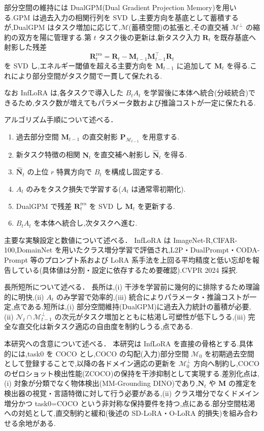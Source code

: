 部分空間の維持には DualGPM(Dual Gradient Projection Memory)を用いる.GPM \cite{gpm} は過去入力の相関行列を SVD し,主要方向を基底として蓄積するが,DualGPM はタスク増加に応じて,$\mathcal{M}$(蓄積空間)の拡張と,その直交補 $\mathcal{M}^{\perp}$ の縮約の双方を陽に管理する.第 $t$ タスク後の更新は,新タスク入力 $\mathbf{R}_t$ を既存基底へ射影した残差
\begin{equation}
\mathbf{R}_t^{\text{res}} = \mathbf{R}_t - \mathbf{M}_{t-1}\mathbf{M}_{t-1}^\top \mathbf{R}_t
\end{equation}
を SVD し,エネルギー閾値を超える主要方向を $\mathbf{M}_{t-1}$ に追加して $\mathbf{M}_t$ を得る.これにより部分空間がタスク間で一貫して保たれる.

なお InfLoRA は,各タスクで導入した $B_t A_t$ を学習後に本体へ統合(分岐統合)できるため,タスク数が増えてもパラメータ数および推論コストが一定に保たれる.

アルゴリズム手順について述べる．
\begin{enumerate}
\item 過去部分空間 $\mathbf{M}_{t-1}$ の直交射影 $\mathbf{P}_{\mathcal{M}_{t-1}}$ を用意する.
\item 新タスク特徴の相関 $\mathbf{N}_t$ を直交補へ射影し $\widehat{\mathbf{N}}_t$ を得る.
\item $\widehat{\mathbf{N}}_t$ の上位 $r$ 特異方向で $B_t$ を構成し固定する.
\item $A_t$ のみをタスク損失で学習する($A_t$ は通常零初期化).
\item DualGPM で残差 $\mathbf{R}_t^{\text{res}}$ を SVD し $\mathbf{M}_t$ を更新する.
\item $B_t A_t$ を本体へ統合し,次タスクへ進む.
\end{enumerate}

主要な実験設定と数値について述べる．
InfLoRA \cite{inflora} は ImageNet-R,CIFAR-100,DomainNet を用いたクラス増分学習で評価され,L2P・DualPrompt・CODA-Prompt 等のプロンプト系および LoRA 系手法を上回る平均精度と低い忘却を報告している(具体値は分割・設定に依存するため要確認).CVPR 2024 採択.

長所短所について述べる．
長所は,(i) 干渉を学習前に幾何的に排除するため理論的に明快,(ii) $A_t$ のみ学習で効率的,(iii) 統合によりパラメータ・推論コストが一定,点である.短所は,(i) 部分空間維持(DualGPM)に過去入力統計の蓄積が必要,(ii) $\mathcal{N}_t \cap \mathcal{M}_{t-1}^{\perp}$ の次元がタスク増加とともに枯渇し可塑性が低下しうる,(iii) 完全な直交化は新タスク適応の自由度を制約しうる,点である.

本研究への含意について述べる．
本研究は InfLoRA を直接の骨格とする.具体的には,task0 を COCO とし,COCO の勾配(入力)部分空間 $\mathcal{M}_0$ を初期過去空間として登録することで,以降の各ドメイン適応の更新を $\mathcal{M}_0^{\perp}$ 方向へ制約し,COCO のゼロショット検出性能(ZCOCO)の保持を干渉抑制として実現する.差別化点は,(i) 対象が分類でなく物体検出(MM-Grounding DINO)であり,$\mathbf{N}_t$ や $\mathbf{M}$ の推定を検出器の視覚・言語特徴に対して行う必要がある,(ii) クラス増分でなくドメイン増分かつ task0=COCO という非対称な保持要件を持つ,点にある.部分空間枯渇への対処として,直交制約と緩和(後述の SD-LoRA・O-LoRA 的損失)を組み合わせる余地がある.

